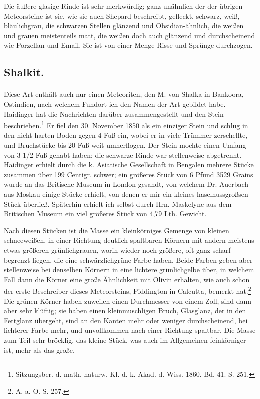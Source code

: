 \documentclass[a4paper, 11pt, oneside]{article}
\begin{document}
Die äußere glasige Rinde ist sehr merkwürdig; ganz unähnlich der der übrigen Meteorsteine ist sie, wie sie auch Shepard beschreibt, gefleckt, schwarz, weiß, bläulichgrau, die schwarzen Stellen glänzend und Obsidian-ähnlich, die weißen und grauen meistenteils matt, die weißen doch auch glänzend und durchscheinend wie Porzellan und Email. Sie ist von einer Menge Risse und Sprünge durchzogen.
\subsection{Shalkit.}
\paragraph{}
Diese Art enthält auch nur einen Meteoriten, den M. von Shalka in Bankoora, Ostindien, nach welchem Fundort ich den Namen der Art gebildet habe. Haidinger hat die Nachrichten darüber zusammengestellt und den Stein beschrieben.\footnote{Sitzungsber. d. math.-naturw. Kl. d. k. Akad. d. Wiss. 1860. Bd. 41. S. 251.} Er fiel den 30. November 1850 als ein einziger Stein und schlug in den nicht harten Boden gegen 4 Fuß ein, wobei er in viele Trümmer zerschellte, und Bruchstücke bis 20 Fuß weit umherflogen. Der Stein mochte einen Umfang von 3 1/2 Fuß gehabt haben; die schwarze Rinde war stellenweise abgetrennt. Haidinger erhielt durch die k. Asiatische Gesellschaft in Bengalen mehrere Stücke zusammen über 199 Centigr. schwer; ein größeres Stück von 6 Pfund 3529 Grains wurde an das Britische Museum in London gesandt, von welchem Dr. Auerbach aus Moskau einige Stücke erhielt, von denen er mir ein kleines haselnussgroßsen Stück überließ. Späterhin erhielt ich selbst durch Hrn. Maskelyne aus dem Britischen Museum ein viel größeres Stück von 4,79 Lth. Gewicht.

Nach diesen Stücken ist die Masse ein kleinkörniges Gemenge von kleinen schneeweißen, in einer Richtung deutlich spaltbaren Körnern mit andern meistens etwas größeren grünlichgrauen, worin wieder noch größere, oft ganz scharf begrenzt liegen, die eine schwärzlichgrüne Farbe haben. Beide Farben geben aber stellenweise bei denselben Körnern in eine lichtere grünlichgelbe über, in welchem Fall dann die Körner eine große Ähnlichkeit mit Olivin erhalten, wie auch schon der erste Beschreiber dieses Meteorsteins, Piddington in Calcutta, bemerkt hat.\footnote{A. a. O. S. 257.} Die grünen Körner haben zuweilen einen Durchmesser von einem Zoll, sind dann aber sehr klüftig; sie haben einen kleinmuschligen Bruch, Glasglanz, der in den Fettglanz übergeht, sind an den Kanten mehr oder weniger durchscheinend, bei lichterer Farbe mehr, und unvollkommen nach einer Richtung spaltbar. Die Masse zum Teil sehr bröcklig, das kleine Stück, was auch im Allgemeinen feinkörniger ist, mehr als das große.
\end{document}
